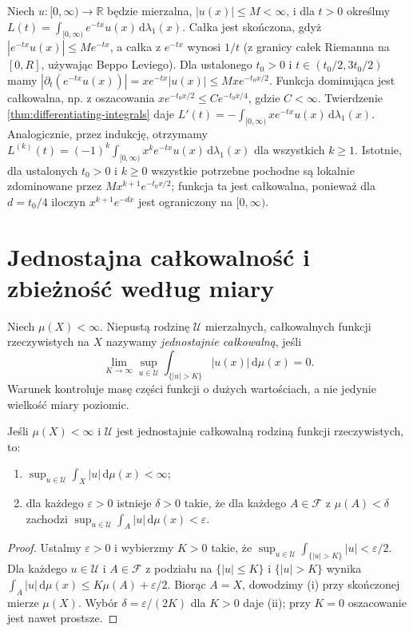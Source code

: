 \begin{przyklad}
Niech $u:[0,\infty)\to\mathbb R$ będzie mierzalna,
$|u(x)|\le M<\infty$, i dla $t>0$ określmy
$L(t)=\int_{[0,\infty)}e^{-tx}u(x)\,\mathrm d\lambda_1(x)$.
Całka jest skończona, gdyż $|e^{-tx}u(x)|\le Me^{-tx}$,
a całka z $e^{-tx}$ wynosi $1/t$ (z granicy
całek Riemanna na $[0,R]$, używając Beppo Leviego).
Dla ustalonego $t_0>0$ i $t\in(t_0/2,3t_0/2)$
mamy
$|\partial_t(e^{-tx}u(x))|=xe^{-tx}|u(x)|
\le Mxe^{-t_0x/2}$.
Funkcja dominująca jest całkowalna, np. z oszacowania
$x e^{-t_0x/2}\le C e^{-t_0x/4}$, gdzie $C<\infty$.
Twierdzenie \ref{thm:differentiating-integrals} daje
$L'(t)=-\int_{[0,\infty)}xe^{-tx}u(x)\,\mathrm d\lambda_1(x)$.
Analogicznie, przez indukcję, otrzymamy
$L^{(k)}(t)=(-1)^k\int_{[0,\infty)}x^ke^{-tx}u(x)
\,\mathrm d\lambda_1(x)$ dla wszystkich $k\ge1$.
Istotnie, dla ustalonych $t_0>0$ i $k\ge0$
wszystkie potrzebne pochodne są lokalnie
zdominowane przez $Mx^{k+1}e^{-t_0x/2}$;
funkcja ta jest całkowalna, ponieważ dla
$d=t_0/4$ iloczyn $x^{k+1}e^{-dx}$ jest
ograniczony na $[0,\infty)$.
\end{przyklad}

\section{Jednostajna całkowalność i zbieżność według miary}

\begin{definicja}
\label{def:uniform-integrability}
Niech $\mu(X)<\infty$. Niepustą rodzinę $\mathcal U$
mierzalnych, całkowalnych funkcji rzeczywistych
na $X$ nazywamy \emph{jednostajnie całkowalną},
jeśli
\[
\lim_{K\to\infty}\sup_{u\in\mathcal U}
\int_{\{|u|>K\}}|u(x)|\,\mathrm d\mu(x)=0.
\]
Warunek kontroluje masę części funkcji o dużych
wartościach, a nie jedynie wielkość miary poziomic.
\end{definicja}

\begin{lemat}
\label{lem:uniform-absolute-continuity}
Jeśli $\mu(X)<\infty$ i $\mathcal U$ jest jednostajnie
całkowalną rodziną funkcji rzeczywistych, to:
\begin{enumerate}[label=\textup{(\roman*)}]
\item $\sup_{u\in\mathcal U}\int_X|u|\,\mathrm d\mu(x)<\infty$;
\item dla każdego $\varepsilon>0$ istnieje $\delta>0$
takie, że dla każdego $A\in\mathcal F$ z
$\mu(A)<\delta$ zachodzi
$\sup_{u\in\mathcal U}\int_A|u|\,\mathrm d\mu(x)<\varepsilon$.
\end{enumerate}
\end{lemat}
\begin{proof}
Ustalmy $\varepsilon>0$ i wybierzmy $K>0$ takie, że
$\sup_{u\in\mathcal U}\int_{\{|u|>K\}}|u|<\varepsilon/2$.
Dla każdego $u\in\mathcal U$ i $A\in\mathcal F$
z podziału na $\{|u|\le K\}$ i $\{|u|>K\}$
wynika
$\int_A|u|\,\mathrm d\mu(x)\le K\mu(A)+\varepsilon/2$.
Biorąc $A=X$, dowodzimy (i) przy skończonej
mierze $\mu(X)$. Wybór
$\delta=\varepsilon/(2K)$ dla $K>0$ daje (ii);
przy $K=0$ oszacowanie jest nawet prostsze.
\end{proof}

